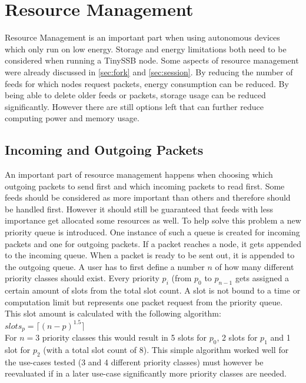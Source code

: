 \chapter{Resource Management}
Resource Management is an important part when using autonomous devices which only run on low energy. Storage and energy limitations both need to be considered when running a TinySSB node. Some aspects of resource management were already discussed in \cref{sec:fork} and \cref{sec:session}. By reducing the number of feeds for which nodes request packets, energy consumption can be reduced. By being able to delete older feeds or packets, storage usage can be reduced significantly.
However there are still options left that can further reduce computing power and memory usage.

\section{Incoming and Outgoing Packets}
An important part of resource management happens when choosing which outgoing packets to send first and which incoming packets to read first. Some feeds should be considered as more important than others and therefore should be handled first. However it should still be guaranteed that feeds with less importance get allocated some resources as well. To help solve this problem a new priority queue is introduced. One instance of such a queue is created for incoming packets and one for outgoing packets. If a packet reaches a node, it gets appended to the incoming queue. When a packet is ready to be sent out, it is appended to the outgoing queue. A user has to first define a number $n$ of how many different priority classes should exist. Every priority $p_i$ (from $p_0$ to $p_{n - 1}$ gets assigned a certain amount of slots from the total slot count. A slot is not bound to a time or computation limit but represents one packet request from the priority queue. This slot amount is calculated with the following algorithm: \\ 
$slots_p = \lceil (n - p)^{1.5} \rceil$ \\
For $n = 3$ priority classes this would result in 5 slots for $p_0$, 2 slots for $p_1$ and 1 slot for $p_2$ (with a total slot count of 8). This simple algorithm worked well for the use-cases tested (3 and 4 different priority classes) must however be reevaluated if in a later use-case significantly more priority classes are needed. \\
